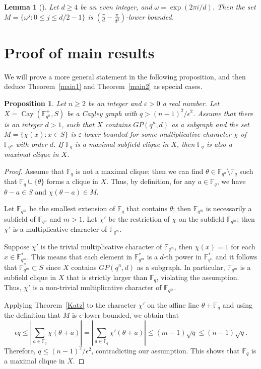 \documentclass[12pt,reqno]{amsart}
\newtheorem{lem}[thm]{Lemma}
\newtheorem{prop}[thm]{Proposition}
\newcommand{\F}{\mathbb{F}}
\begin{document}
\begin{lem}[{\cite[Lemma 4.5]{AY}}]\label{GP*lem} 
Let $d \geq 4$ be an even integer, and $\omega=\exp(2\pi i/d)$. Then the set $M=\{\omega^j :0 \leq j \leq d/2-1\}$ is $\left(\frac{\pi}{d}-\frac{\pi}{d^2}\right)$-lower bounded.
\end{lem}

\section{Proof of main results}

We will prove a more general statement in the following proposition, and then deduce Theorem~\ref{main1} and Theorem~\ref{main2} as special cases.

\begin{prop}\label{mainprop}
Let $n \geq 2$ be an integer and $\varepsilon>0$ a real number. Let $X=\operatorname{Cay}(\F_{q^n}^+, S)$ be a Cayley graph with $q>(n-1)^2/\epsilon^2$. Assume that there is an integer $d>1$, such that $X$ contains $GP(q^n,d)$ as a subgraph and the set $M=\{\chi(x): x \in S\}$ is $\varepsilon$-lower bounded for some multiplicative character $\chi$ of $\F_{q^n}$ with order $d$. If $\F_q$ is a maximal subfield clique in $X$, then $\F_q$ is also a maximal clique in $X$.
\end{prop}
\begin{proof}
Assume that $\F_q$ is not a maximal clique; then we can find $\theta \in \F_{q^n} \setminus \F_q$ such that $\F_q \cup \{\theta\}$ forms a clique in $X$. Thus, by definition, for any $a \in \F_q$, we have $\theta-a \in S$ and $\chi(\theta-a) \in M$.

Let $\F_{q^m}$ be the smallest extension of $\F_q$ that contains $\theta$; then $\F_{q^m}$ is necessarily a subfield of $\F_{q^n}$ and $m>1$. Let $\chi'$ be the restriction of $\chi$ on the subfield $\F_{q^m}$; then $\chi'$ is a multiplicative character of $\F_{q^m}$. 

Suppose $\chi'$ is the trivial multiplicative character of $\F_{q^m}$, then $\chi(x)=1$ for each $x \in \F_{q^m}^*$. This means that each element in $\F_{q^m}^*$ is a $d$-th power in $\F_{q^n}^*$ and it follows that $\F_{q^m}^* \subset S$ since $X$ contains $GP(q^n,d)$ as a subgraph. In particular, $\F_{q^m}$ is a subfield clique in $X$ that is strictly larger than $\F_q$, violating the assumption. Thus, $\chi'$ is a non-trivial multiplicative character of $\F_{q^m}$. 

Applying Theorem~\ref{Katz} to the character $\chi'$ on the affine line $\theta+\F_q$ and using the definition that $M$ is $\epsilon$-lower bounded, we obtain that
$$
\epsilon q \leq \left|\sum_{a \in \mathbb{F}_{q}} \chi(\theta+a)\right| =\left|\sum_{a \in \mathbb{F}_{q}} \chi'(\theta+a)\right|\leq(m-1) \sqrt{q} \leq (n-1)\sqrt{q}.
$$
Therefore, $q \leq (n-1)^2/\epsilon^2$, contradicting our assumption. This shows that $\F_q$ is a maximal clique in $X$.
\end{proof}
\end{document}

